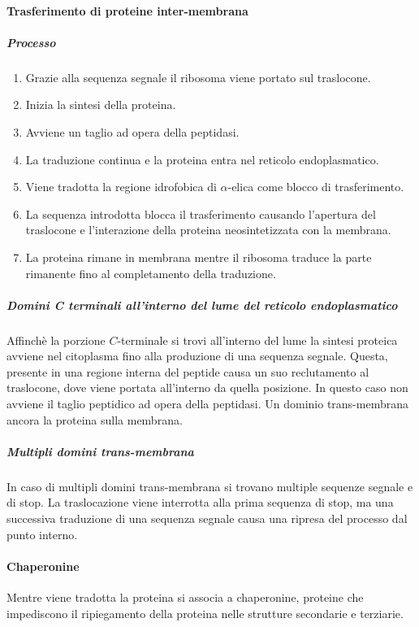 			\paragraph{Trasferimento di proteine inter-membrana}

				\subparagraph{Processo}
				\begin{multicols}{2}
					\begin{enumerate}
						\item Grazie alla sequenza segnale il ribosoma viene portato sul traslocone.
						\item Inizia la sintesi della proteina.
						\item Avviene un taglio ad opera della peptidasi.
						\item La traduzione continua e la proteina entra nel reticolo endoplasmatico.
						\item Viene tradotta la regione idrofobica di $\alpha$-elica come blocco di trasferimento.
						\item La sequenza introdotta blocca il trasferimento causando l'apertura del traslocone e l'interazione della proteina neosintetizzata con la membrana.
						\item La proteina rimane in membrana mentre il ribosoma traduce la parte rimanente fino al completamento della traduzione.
					\end{enumerate}
				\end{multicols}

				\subparagraph{Domini C terminali all'interno del lume del reticolo endoplasmatico}
				Affinch\`e la porzione $C$-terminale si trovi all'interno del lume la sintesi proteica avviene nel citoplasma fino alla produzione di una sequenza segnale.
				Questa, presente in una regione interna del peptide causa un suo reclutamento al traslocone, dove viene portata all'interno da quella posizione.
				In questo caso non avviene il taglio peptidico ad opera della peptidasi.
				Un dominio trans-membrana ancora la proteina sulla membrana.

				\subparagraph{Multipli domini trans-membrana}
				In caso di multipli domini trans-membrana si trovano multiple sequenze segnale e di stop.
				La traslocazione viene interrotta alla prima sequenza di stop, ma una successiva traduzione di una sequenza segnale causa una ripresa del processo dal punto interno.

			\paragraph{Chaperonine}
			Mentre viene tradotta la proteina si associa a chaperonine, proteine che impediscono il ripiegamento della proteina nelle strutture secondarie e terziarie.

